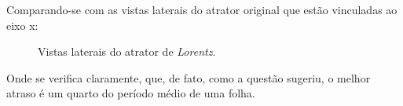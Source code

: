 \documentclass{article}[twocolumn]
\begin{document}
	Comparando-se com as vistas laterais do atrator original que est\~ao vinculadas
	ao eixo x:
	\begin{figure}[H]
		\centering
		\caption{Vistas laterais do atrator de \textit{Lorentz}.}
	\end{figure}
	Onde se verifica claramente, que, de fato, como a quest\~ao sugeriu, o melhor atraso \'e
	um quarto do per\'iodo m\'edio de uma folha.
\end{document}
